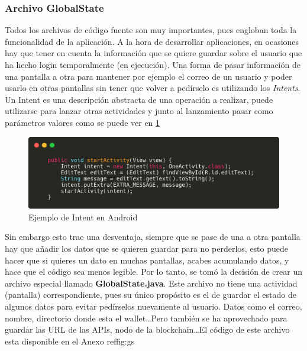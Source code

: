 \subsubsection{Archivo GlobalState}

Todos los archivos de código fuente son muy importantes, pues engloban toda la funcionalidad de la aplicación. A la hora de desarrollar aplicaciones, en ocasiones hay que tener en cuenta la información que se quiere guardar sobre el usuario que ha hecho login temporalmente (en ejecución). Una forma de pasar información de una pantalla a otra para mantener por ejemplo el correo de un usuario y poder usarlo en otras pantallas sin tener que volver a pedírselo es utilizando los \emph{Intents}. Un Intent es una descripción abstracta de una operación a realizar, puede utilizarse para lanzar otras actividades y junto al lanzamiento pasar como parámetros valores como se puede ver en \ref{fig:intents} \\

\begin{figure}[h!]
  \centering
  \includegraphics[width=0.8\linewidth]{figs/Desarrollo/Codigo/intents}
  \caption[Ejemplo de Intent en Android]{Ejemplo de Intent en Android}
  \label{fig:intents}
\end{figure}

Sin embargo esto trae una desventaja, siempre que se pase de una a otra pantalla hay que añadir los datos que se quieren guardar para no perderlos, esto puede hacer que si quieres un dato en muchas pantallas, acabes acumulando datos, y hace que el código sea menos legible. Por lo tanto, se tomó la decisión de crear un archivo especial llamado \textbf{GlobalState.java}. Este archivo no tiene una actividad (pantalla) correspondiente, pues su único propósito es el de guardar el estado de algunos datos para evitar pedírselos nuevamente al usuario. Datos como el correo, nombre, directorio donde esta el wallet\dots Pero también se ha aprovechado para guardar las URL de las APIs, nodo de la blockchain\dots El código de este archivo esta disponible en el Anexo ref{fig:gs}



